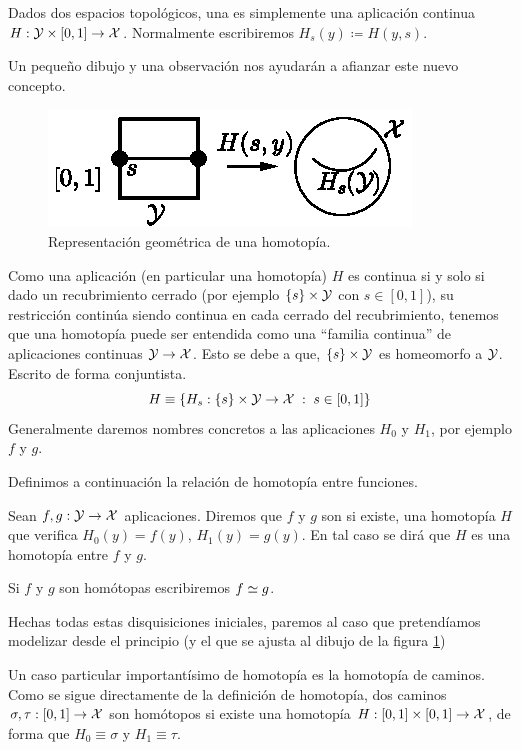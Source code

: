 \begin{defi}[Homotopía]
	Dados dos espacios topológicos, una  es simplemente una aplicación continua $H:\mathcal{Y}\times [0,1]\to \mathcal{X}$. Normalmente escribiremos $H_s(y) \coloneqq H(y,s)$. 
\end{defi}
Un pequeño dibujo y una observación nos ayudarán a afianzar este nuevo concepto.
\begin{figure}[h!]
	\centering
	\label{grf_homotopia1}
	\includegraphics[scale = 1]{img/homotopia1}
	\caption{Representación geométrica de una homotopía.}
\end{figure}
\begin{obs}
	Como una aplicación (en particular una homotopía) $H$ es continua si y solo si dado un recubrimiento cerrado (por ejemplo $\{s\}\times\mathcal{Y}$ con $s\in[0,1]$), su restricción continúa siendo continua en cada cerrado del recubrimiento, tenemos que una homotopía puede ser entendida como una ``familia continua'' de aplicaciones continuas $\mathcal{Y}\to\mathcal{X}$. Esto se debe a que, $\{s\}\times\mathcal{Y}$ es homeomorfo a $\mathcal{Y}$. Escrito de forma conjuntista.
	\begin{equation*}
		H\equiv\{H_s:\{s\}\times\mathcal{Y}\to\mathcal{X}\;:\; s\in[0,1]\}
	\end{equation*}
	Generalmente daremos nombres concretos a las aplicaciones $H_0$ y $H_1$, por ejemplo $f$ y $g$.
\end{obs}
Definimos a continuación la relación de homotopía entre funciones.
\begin{defi}
	Sean $f,g:\mathcal{Y}\to\mathcal{X}$ aplicaciones. Diremos que $f$ y $g$ son  si existe, una homotopía $H$ que verifica $H_0(y)=f(y)$, $H_1(y)=g(y)$. En tal caso se dirá que $H$ es una homotopía entre $f$ y $g$.
	
	Si $f$ y $g$ son homótopas escribiremos $f\mathrel{\smash{\underset{}{\simeq}}} g$.
\end{defi}
Hechas todas estas disquisiciones iniciales, paremos al caso que pretendíamos modelizar desde el principio (y el que se ajusta al dibujo de la figura \ref{grf_homotopia1})
\begin{obs}
	Un caso particular importantísimo de homotopía es la homotopía de caminos. Como se sigue directamente de la definición de homotopía, dos caminos $\sigma,\tau:[0,1]\to\mathcal{X}$ son homótopos si existe una homotopía $H:[0,1]\times [0,1]\to\mathcal{X}$, de forma que $H_0\equiv\sigma$ y $H_1\equiv\tau$.
\end{obs} 
